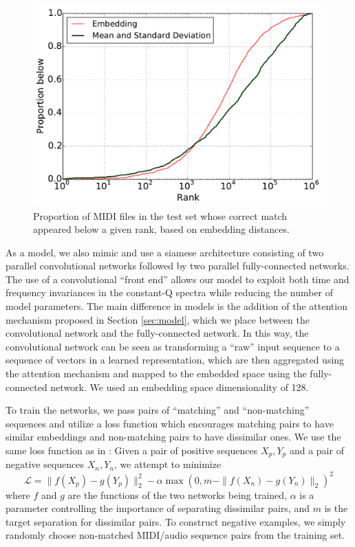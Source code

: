 \documentclass{article}
\begin{document}
\begin{figure}[t]
  \centering
  \includegraphics[width=\columnwidth]{ranks.pdf}
  \caption{Proportion of MIDI files in the test set whose correct match appeared below a given rank, based on embedding distances.}
  \label{fig:ranks}
\end{figure}

As a model, we also mimic \cite{raffel2015large} and use a siamese architecture consisting of two parallel convolutional networks followed by two parallel fully-connected networks.
The use of a convolutional ``front end'' allows our model to exploit both time and frequency invariances in the constant-Q spectra while reducing the number of model parameters.
The main difference in models is the addition of the attention mechanism proposed in Section \ref{sec:model}, which we place between the convolutional network and the fully-connected network.
In this way, the convolutional network can be seen as transforming a ``raw'' input sequence to a sequence of vectors in a learned representation, which are then aggregated using the attention mechanism and mapped to the embedded space using the fully-connected network.
We used an embedding space dimensionality of 128.

To train the networks, we pass pairs of ``matching'' and ``non-matching'' sequences and utilize a loss function which encourages matching pairs to have similar embeddings and non-matching pairs to have dissimilar ones.
We use the same loss function as in \cite{raffel2015large}: Given a pair of positive sequences $X_p, Y_p$ and a pair of negative sequences $X_n, Y_n$, we attempt to minimize
$$
\mathcal{L} = \|f(X_p) - g(Y_p)\|_2^2 - \alpha \max(0, m - \|f(X_n) - g(Y_n)\|_2)^2
$$
where $f$ and $g$ are the functions of the two networks being trained, $\alpha$ is a parameter controlling the importance of separating dissimilar pairs, and $m$ is the target separation for dissimilar pairs.
To construct negative examples, we simply randomly choose non-matched MIDI/audio sequence pairs from the training set.
\end{document}
